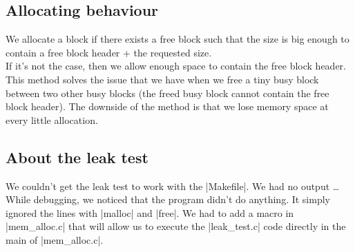 \documentclass[twoside]{article}
\begin{document}
\subsection{Allocating behaviour}
We allocate a block if there exists a free block such that the size is big
enough to contain a free block header + the requested size.\\

If it's not the case, then we allow enough space to contain the free block
header. This method solves the issue that we have when we free a tiny busy block
between two other busy blocks (the freed busy block cannot contain the free block
header). The downside of the method is that we lose memory space at every little allocation.

\subsection{About the leak test}
We couldn't get the leak test to work with the |Makefile|. We had no output \ldots
While debugging, we noticed that the program didn't do anything. It simply
ignored the lines with |malloc| and |free|.
We had to add a macro in |mem_alloc.c| that will allow us to execute the
|leak_test.c| code directly in the main of |mem_alloc.c|.
\end{document}
